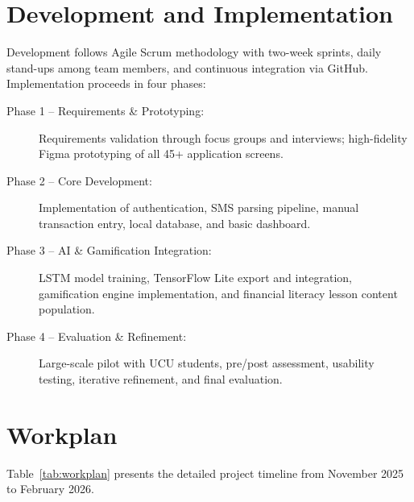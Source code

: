 \documentclass[12pt,a4paper]{report}
\begin{document}
\section{Development and Implementation}

Development follows Agile Scrum methodology with two-week sprints, daily stand-ups
among team members, and continuous integration via GitHub. Implementation proceeds
in four phases:

\begin{description}
    \item[Phase 1 -- Requirements \& Prototyping:] Requirements validation through focus groups and interviews; high-fidelity Figma prototyping of all 45+ application screens.
    \item[Phase 2 -- Core Development:] Implementation of authentication, SMS parsing pipeline, manual transaction entry, local database, and basic dashboard.
    \item[Phase 3 -- AI \& Gamification Integration:] LSTM model training, TensorFlow Lite export and integration, gamification engine implementation, and financial literacy lesson content population.
    \item[Phase 4 -- Evaluation \& Refinement:] Large-scale pilot with UCU students, pre/post assessment, usability testing, iterative refinement, and final evaluation.
\end{description}

\section{Workplan}

Table~\ref{tab:workplan} presents the detailed project timeline from November 2025 to
February 2026.
\end{document}
